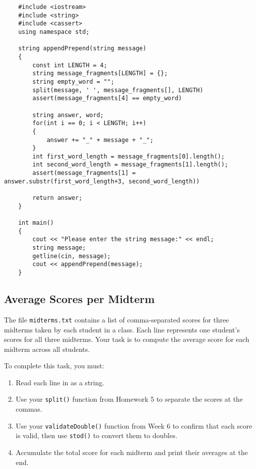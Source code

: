 \begin{verbatim}
    #include <iostream>
    #include <string>
    #include <cassert>
    using namespace std;
    
    string appendPrepend(string message)
    {
        const int LENGTH = 4;
        string message_fragments[LENGTH] = {};
        string empty_word = "";
        split(message, ' ', message_fragments[], LENGTH) 
        assert(message_fragments[4] == empty_word) 
    
        string answer, word; 
        for(int i == 0; i < LENGTH; i++)
        {
            answer += "_" + message + "_";
        }
        int first_word_length = message_fragments[0].length();
        int second_word_length = message_fragments[1].length();
        assert(message_fragments[1] = answer.substr(first_word_length+3, second_word_length))
    
        return answer;
    }
    
    int main()
    {
        cout << "Please enter the string message:" << endl;
        string message;
        getline(cin, message);
        cout << appendPrepend(message);
    }
\end{verbatim}

\newpage 

\subsection{Average Scores per Midterm}

The file \texttt{midterms.txt} contains a list of comma-separated scores for three midterms taken by each student in a class. Each line represents one student’s scores for all three midterms. Your task is to compute the average score for each midterm across all students.

To complete this task, you must:

\begin{enumerate}
    \item Read each line in as a string.
    \item Use your \texttt{split()} function from Homework 5 to separate the scores at the commas.
    \item Use your \texttt{validateDouble()} function from Week 6 to confirm that each score is valid, then use \texttt{stod()} to convert them to doubles.
    \item Accumulate the total score for each midterm and print their averages at the end.
\end{enumerate}

